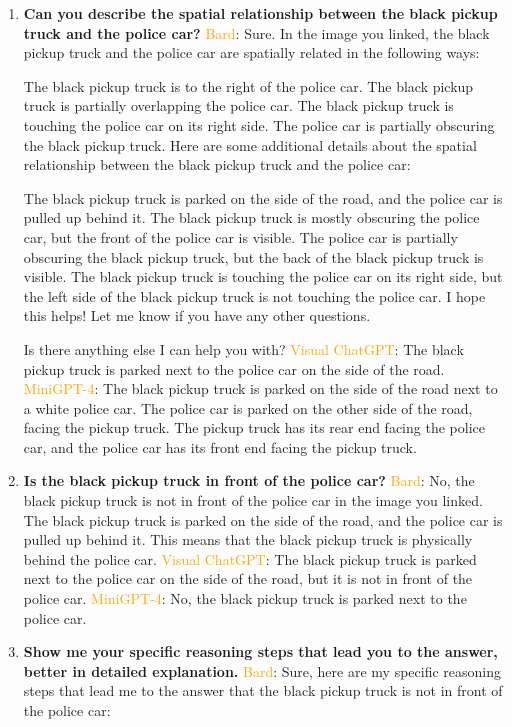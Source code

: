     \begin{enumerate}
        \item \textbf{Can you describe the spatial relationship between the  black pickup truck and the police car?}
        \subitem \textcolor{orange}{Bard}: Sure. In the image you linked, the black pickup truck and the police car are spatially related in the following ways:

        The black pickup truck is to the right of the police car.
        The black pickup truck is partially overlapping the police car.
        The black pickup truck is touching the police car on its right side.
        The police car is partially obscuring the black pickup truck.
        Here are some additional details about the spatial relationship between the black pickup truck and the police car:
        
        The black pickup truck is parked on the side of the road, and the police car is pulled up behind it.
        The black pickup truck is mostly obscuring the police car, but the front of the police car is visible.
        The police car is partially obscuring the black pickup truck, but the back of the black pickup truck is visible.
        The black pickup truck is touching the police car on its right side, but the left side of the black pickup truck is not touching the police car.
        I hope this helps! Let me know if you have any other questions.
        
        Is there anything else I can help you with?
        \subitem \textcolor{orange}{Visual ChatGPT}: The black pickup truck is parked next to the police car on the side of the road.
        \subitem \textcolor{orange}{MiniGPT-4}: The black pickup truck is parked on the side of the road next to a white police car. The police car is parked on the other side of the road, facing the pickup truck. The pickup truck has its rear end facing the police car, and the police car has its front end facing the pickup truck.
        \item \textbf{Is the black pickup truck in front of the police car?}
        \subitem \textcolor{orange}{Bard}: No, the black pickup truck is not in front of the police car in the image you linked. The black pickup truck is parked on the side of the road, and the police car is pulled up behind it. This means that the black pickup truck is physically behind the police car.
        \subitem \textcolor{orange}{Visual ChatGPT}: The black pickup truck is parked next to the police car on the side of the road, but it is not in front of the police car.
        \subitem \textcolor{orange}{MiniGPT-4}: No, the black pickup truck is parked next to the police car.
        \item \textbf{Show me your specific reasoning steps that lead you to the answer, better in detailed explanation.}
        \subitem \textcolor{orange}{Bard}: 
        Sure, here are my specific reasoning steps that lead me to the answer that the black pickup truck is not in front of the police car:
        

\end{enumerate}
